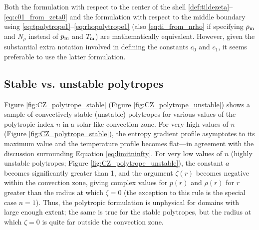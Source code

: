 \documentclass[12pt]{article} %
\begin{document}
Both the formulation with respect to the center of the shell \eqref{def:tildezeta}--\eqref{eq:c01_from_zeta0} and the formulation with respect to the middle boundary using \eqref{eq:tpolytrope1}--\eqref{eq:rhopolytrope1} (also \eqref{eq:ti_from_nrho} if specifying $\rho_{\rm{m}}$ and $N_\rho$ instead of $p_{\rm{m}}$ and $T_{\rm{m}}$) are mathematically equivalent. However, given the substantial extra notation involved in defining the constants $c_0$ and $c_1$, it seems preferable to use the latter formulation. 

\subsection{Stable vs. unstable polytropes}
Figure \ref{fig:CZ_polytrope_stable} (Figure \ref{fig:CZ_polytrope_unstable}) shows a sample of convectively stable (unstable) polytropes for various values of the polytropic index $n$ in a solar-like convection zone. For very high values of $n$ (Figure \ref{fig:CZ_polytrope_stable}), the entropy gradient profile asymptotes to its maximum value and the temperature profile becomes flat---in agreement with the discussion surrounding Equation \eqref{eq:limitninfty}. For very low values of $n$ (highly unstable polytropes; Figure \ref{fig:CZ_polytrope_unstable}), the constant $a$ becomes significantly greater than 1, and the argument $\zeta(r)$ becomes negative within the convection zone, giving complex values for $p(r)$ and $\rho(r)$ for $r$ greater than the radius at which $\zeta=0$ (the exception to this rule is the special case $n=1$). Thus, the polytropic formulation is unphysical for domains with large enough extent; the same is true for the stable polytropes, but the radius at which $\zeta=0$ is quite far outside the convection zone.
\end{document}
